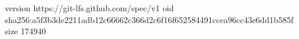 version https://git-lfs.github.com/spec/v1
oid sha256:a5f3b3de2211adb12c66662c366d2c6f16f652584491ccea96cc43e6dd1b585f
size 174940

